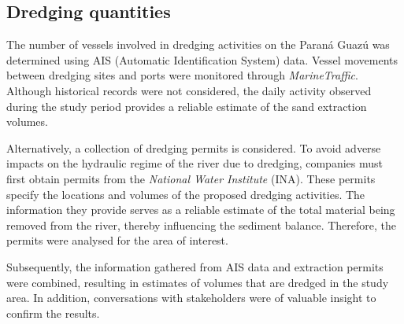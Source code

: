 \subsection{Dredging quantities}
The number of vessels involved in dredging activities on the Paraná Guazú was determined using AIS (Automatic Identification System) data. Vessel movements between dredging sites and ports were monitored through \textit{MarineTraffic}. Although historical records were not considered, the daily activity observed during the study period provides a reliable estimate of the sand extraction volumes. 

Alternatively, a collection of dredging permits is considered. To avoid adverse impacts on the hydraulic regime of the river due to dredging, companies must first obtain permits from the \textit{National Water Institute }(INA). These permits specify the locations and volumes of the proposed dredging activities. The information they provide serves as a reliable estimate of the total material being removed from the river, thereby influencing the sediment balance. Therefore, the permits were analysed for the area of interest.

Subsequently, the information gathered from AIS data and extraction permits were combined, resulting in estimates of volumes that are dredged in the study area. In addition, conversations with stakeholders were of valuable insight to confirm the results. 


